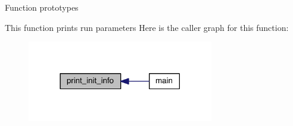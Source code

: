 Function prototypes

This function prints run parameters Here is the caller graph for this function\+:\nopagebreak
\begin{figure}[H]
\begin{center}
\leavevmode
\includegraphics[width=230pt]{a00146_a2270624f104a1d261314dd112e4a1d1d_icgraph}
\end{center}
\end{figure}
